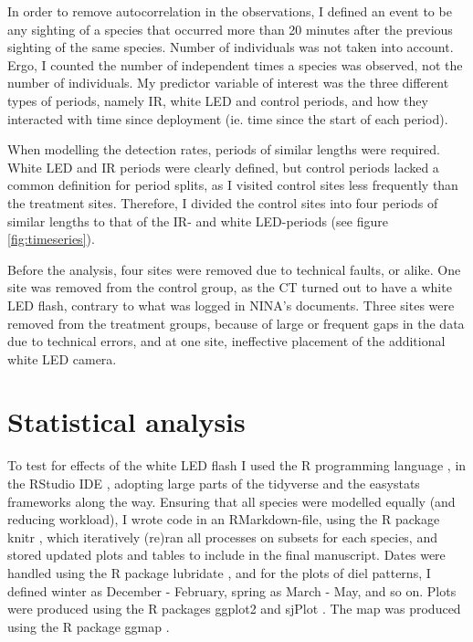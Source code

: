 In order to remove autocorrelation in the observations, I defined an event to be any sighting of a species that occurred more than 20 minutes after the previous sighting of the same species.
Number of individuals was not taken into account.
Ergo, I counted the number of independent times a species was observed, not the number of individuals.
My predictor variable of interest was the three different types of periods, namely IR, white LED and control periods, and how they interacted with time since deployment (ie. time since the start of each period).


When modelling the detection rates, periods of similar lengths were required.
White LED and IR periods were clearly defined, but control periods lacked a common definition for period splits, as I visited control sites less frequently than the treatment sites.
Therefore, I divided the control sites into four periods of similar lengths to that of the IR- and white LED-periods (see figure \ref{fig:timeseries}). 


Before the analysis, four sites were removed due to technical faults, or alike.
One site was removed from the control group, as the CT turned out to have a white LED flash, contrary to what was logged in NINA's documents.
Three sites were removed from the treatment groups, because of large or frequent gaps in the data due to technical errors, and at one site, ineffective placement of the additional white LED camera. 






\section{Statistical analysis} 

To test for effects of the white LED flash I used the R programming language \autocite{R-base}, in the RStudio IDE \autocite{RStudio}, adopting large parts of the tidyverse \autocite{tidyverse} and the easystats \autocite{easystats} frameworks along the way. 
Ensuring that all species were modelled equally (and reducing workload), I wrote code in an RMarkdown-file, using the R package knitr \cite{knitr2015}, which iteratively (re)ran all processes on subsets for each species, and stored updated plots and tables to include in the final manuscript. 
Dates were handled using the R package lubridate \autocite{R-lubridate}, and for the plots of diel patterns, I defined winter as December - February, spring as March - May, and so on. 
Plots were produced using the R packages ggplot2 \autocite{ggplot2} and sjPlot \autocite{R-sjPlot}.
The map was produced using the R package ggmap \autocite{R-ggmap}.

